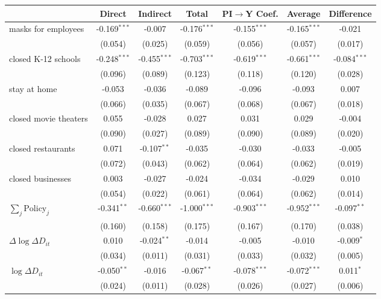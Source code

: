 
\begin{tabular}{lccccc|>{}c}
\toprule
  & Direct & Indirect & Total & PI$\to$Y Coef. & Average & Difference\\
\midrule
masks for employees & -0.169$^{***}$ & -0.007 & -0.176$^{***}$ & -0.155$^{***}$ & -0.165$^{***}$ & -0.021\\
 & (0.054) & (0.025) & (0.059) & (0.056) & (0.057) & (0.017)\\
closed K-12 schools & -0.248$^{***}$ & -0.455$^{***}$ & -0.703$^{***}$ & -0.619$^{***}$ & -0.661$^{***}$ & -0.084$^{***}$\\
 & (0.096) & (0.089) & (0.123) & (0.118) & (0.120) & (0.028)\\
stay at home & -0.053 & -0.036 & -0.089 & -0.096 & -0.093 & 0.007\\
 & (0.066) & (0.035) & (0.067) & (0.068) & (0.067) & (0.018)\\
closed movie theaters & 0.055 & -0.028 & 0.027 & 0.031 & 0.029 & -0.004\\
 & (0.090) & (0.027) & (0.089) & (0.090) & (0.089) & (0.020)\\
closed restaurants & 0.071 & -0.107$^{**}$ & -0.035 & -0.030 & -0.033 & -0.005\\
 & (0.072) & (0.043) & (0.062) & (0.064) & (0.062) & (0.019)\\
closed businesses & 0.003 & -0.027 & -0.024 & -0.034 & -0.029 & 0.010\\
 & (0.054) & (0.022) & (0.061) & (0.064) & (0.062) & (0.014)\\
$\sum_j \mathrm{Policy}_j$ & -0.341$^{**}$ & -0.660$^{***}$ & -1.000$^{***}$ & -0.903$^{***}$ & -0.952$^{***}$ & -0.097$^{**}$\\
 & (0.160) & (0.158) & (0.175) & (0.167) & (0.170) & (0.038)\\
$\Delta \log \Delta D_{it}$ & 0.010 & -0.024$^{**}$ & -0.014 & -0.005 & -0.010 & -0.009$^{*}$\\
 & (0.034) & (0.011) & (0.031) & (0.033) & (0.032) & (0.005)\\
$\log \Delta D_{it}$ & -0.050$^{**}$ & -0.016 & -0.067$^{**}$ & -0.078$^{***}$ & -0.072$^{***}$ & 0.011$^{*}$\\
 & (0.024) & (0.011) & (0.028) & (0.026) & (0.027) & (0.006)\\
\bottomrule
\end{tabular}